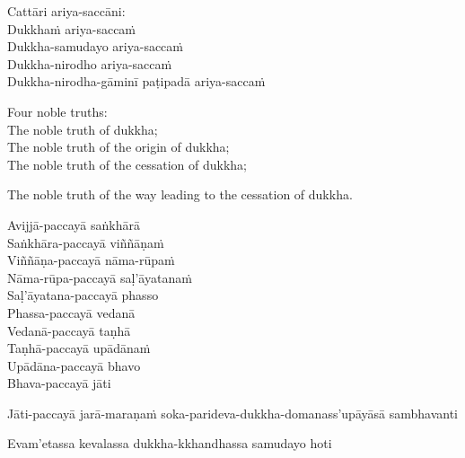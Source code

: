 \suttaRef{[Vibh]}

\ifbfive\clearpage\fi
\ifafive\clearpage\fi

\begin{pali-hang-continued}
  Cattāri ariya-saccāni:\\
  Dukkhaṁ ariya-saccaṁ\\
  Dukkha-samudayo ariya-saccaṁ\\
  Dukkha-nirodho ariya-saccaṁ\\
  Dukkha-nirodha-gāminī paṭipadā ariya-saccaṁ
\end{pali-hang-continued}

\begin{english-verses}
  Four noble truths:\\
  The noble truth of dukkha;\\
  The noble truth of the origin of dukkha;\\
  \ifninebythirteen\clearpage\fi
  The noble truth of the cessation of dukkha;\\
  \begin{english-hang-together-verses}
  The noble truth of the way leading to the cessation of dukkha.
  \end{english-hang-together-verses}
\end{english-verses}

\suttaRef{[SN 56.24]}

\begin{pali-hang-continued}
  Avijjā-paccayā saṅkhārā\\
  Saṅkhāra-paccayā viññāṇaṁ\\
  Viññāṇa-paccayā nāma-rūpaṁ\\
  Nāma-rūpa-paccayā saḷ'āyatanaṁ\\
  Saḷ'āyatana-paccayā phasso\\
  Phassa-paccayā vedanā\\
  Vedanā-paccayā taṇhā\\
  Taṇhā-paccayā upādānaṁ\\
  Upādāna-paccayā bhavo\\
  Bhava-paccayā jāti\\
  \begin{pali-hang-together}
    Jāti-paccayā jarā-maraṇaṁ soka-parideva-dukkha-domanass'upāyāsā sambhavanti
  \end{pali-hang-together}
  \begin{pali-hang-together}
    Evam'etassa kevalassa dukkha-kkhandhassa samudayo hoti
  \end{pali-hang-together}
\end{pali-hang-continued}

